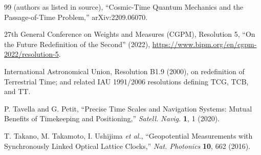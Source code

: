 \documentclass[11pt]{article}
\begin{document}
\begin{thebibliography}{99}
 (authors as listed in source), ``Cosmic-Time Quantum Mechanics and the Passage-of-Time Problem,'' arXiv:2209.06070.

 27th General Conference on Weights and Measures (CGPM), Resolution 5, ``On the Future Redefinition of the Second'' (2022), \url{https://www.bipm.org/en/cgpm-2022/resolution-5}.

 International Astronomical Union, Resolution B1.9 (2000), on redefinition of Terrestrial Time; and related IAU 1991/2006 resolutions defining TCG, TCB, and TT.

 P. Tavella and G. Petit, ``Precise Time Scales and Navigation Systems: Mutual Benefits of Timekeeping and Positioning,'' \textit{Satell. Navig.} \textbf{1}, 1 (2020).

 T. Takano, M. Takamoto, I. Ushijima \textit{et al.}, ``Geopotential Measurements with Synchronously Linked Optical Lattice Clocks,'' \textit{Nat. Photonics} \textbf{10}, 662 (2016).

\end{thebibliography}
\end{document}
